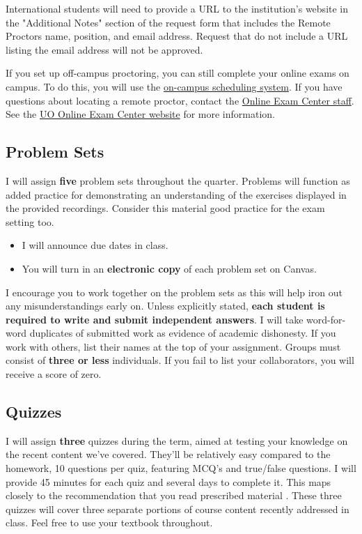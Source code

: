 \documentclass[10pt]{article}
\begin{document}
\bigskip

\noindent International students will need to provide a URL to the institution's website in the "Additional Notes" section of the request form that includes the Remote Proctors name, position, and email address. Request that do not include a URL listing the email address will not be approved. 

\bigskip

\noindent If you set up off-campus proctoring, you can still complete your online exams on campus. To do this, you will use the \href{https://online.uoregon.edu/campus-proctoring}{on-campus scheduling system}. 
If you have questions about locating a remote proctor, contact the \href{https://online.uoregon.edu/examcenter#contact}{Online Exam Center staff}. 
See the \href{https://online.uoregon.edu/examcenter}{UO Online Exam Center website} for more information. 

\subsection*{Problem Sets} 

I will assign \textbf{five} problem sets throughout the quarter. Problems will function as added practice for demonstrating an understanding of the exercises displayed in the provided recordings. Consider this material good practice for the exam setting too.
\begin{itemize}
	\setlength{\itemsep}{0pt}
	\item I will announce due dates in class. 
	\item You will turn in an \textbf{electronic copy} of each problem set on Canvas.
\end{itemize}
I encourage you to work together on the problem sets as this will help iron out any misunderstandings early on. 
Unless explicitly stated, \textbf{each student is required to write and submit independent answers}. 
I will take word-for-word duplicates of submitted work as evidence of academic dishonesty. 
If you work with others, list their names at the top of your assignment. Groups must consist of {\bf three or less} individuals. 
If you fail to list your collaborators, you will receive a score of zero.

\subsection*{Quizzes}

I will assign \textbf{three} quizzes during the term, aimed at testing your knowledge on the recent content we've covered.
They'll be relatively easy compared to the homework, 10 questions per quiz, featuring MCQ's and true/false questions. 
I will provide 45 minutes for each quiz and several days to complete it. 
This maps closely to the recommendation that you read prescribed material . 
These three quizzes will cover three separate portions of course content recently addressed in class.
Feel free to use your textbook throughout.
\end{document}
